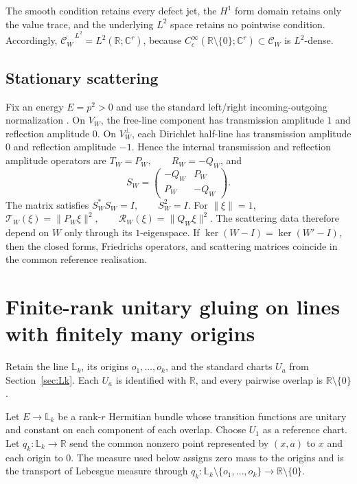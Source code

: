 \documentclass[11pt]{article}
\theoremstyle{plain}
\theoremstyle{definition}
\newcommand{\R}{\mathbb{R}}
\newcommand{\C}{\mathbb{C}}
\begin{document}
The smooth condition retains every defect jet, the \(H^1\) form domain retains only the value trace, and the underlying \(L^2\) space retains no pointwise condition. Accordingly,
\(\overline{\mathcal C_W}^{\,L^2}=L^2(\R;\C^r)\),
because \(C_c^\infty(\R\setminus\{0\};\C^r)\subset\mathcal C_W\) is \(L^2\)-dense.

\subsection{Stationary scattering}

Fix an energy \(E=p^2>0\) and use the standard left/right incoming-outgoing normalization
\citep{KostrykinSchrader99,BerkolaikoKuchment2013}. On \(V_W\), the free-line component has transmission amplitude \(1\) and reflection amplitude \(0\). On \(V_W^\perp\), each Dirichlet half-line has transmission amplitude \(0\) and reflection amplitude \(-1\). Hence the internal transmission and reflection amplitude operators are
\(T_W=P_W, \qquad R_W=-Q_W\),
and
\[
S_W=
\begin{pmatrix}
-Q_W&P_W\\
P_W&-Q_W
\end{pmatrix}.
\]
The matrix satisfies
\(S_W^\ast S_W=I, \qquad S_W^2=I\).
For \(\|\xi\|=1\),
\(\mathcal T_W(\xi)=\|P_W\xi\|^2, \qquad \mathcal R_W(\xi)=\|Q_W\xi\|^2\).
The scattering data therefore depend on \(W\) only through its \(1\)-eigenspace. If
\(\ker(W-I)=\ker(W'-I)\),
then the closed forms, Friedrichs operators, and scattering matrices coincide in the common reference realisation.

\section{Finite-rank unitary gluing on lines with finitely many origins}
\label{sec:unitary-Lk}

Retain the line \(\mathbb L_k\), its origins \(o_1,\ldots,o_k\), and the standard
charts \(U_a\) from Section~\ref{sec:Lk}. Each \(U_a\) is identified with
\(\R\), and every pairwise overlap is \(\R\setminus\{0\}\).

Let \(E\to \mathbb L_k\) be a rank-\(r\) Hermitian bundle whose transition functions are unitary and constant on each component of each overlap. Choose \(U_1\) as a reference chart. Let \(q_k:\mathbb L_k\to\R\) send the common nonzero point represented by \((x,a)\) to \(x\) and each origin to \(0\). The measure used below assigns zero mass to the origins and is the transport of Lebesgue measure through
\(q_k: \mathbb L_k\setminus\{o_1,\ldots,o_k\} \longrightarrow \R\setminus\{0\}\).
\end{document}
